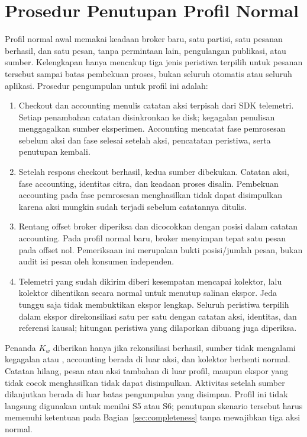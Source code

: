\section{Prosedur Penutupan Profil Normal}
Profil normal awal memakai keadaan broker baru, satu partisi, satu pesanan berhasil, dan satu pesan, tanpa permintaan lain, pengulangan publikasi, atau  sumber. Kelengkapan hanya mencakup tiga jenis peristiwa terpilih untuk pesanan tersebut sampai batas pembekuan proses, bukan seluruh  otomatis atau seluruh aplikasi. Prosedur pengumpulan untuk profil ini adalah:
\begin{enumerate}
  \item Checkout dan accounting menulis catatan aksi terpisah dari SDK telemetri. Setiap penambahan catatan disinkronkan ke disk; kegagalan penulisan menggagalkan sumber eksperimen. Accounting mencatat fase pemrosesan sebelum aksi dan fase selesai setelah aksi, pencatatan peristiwa, serta penutupan  kembali.
  \item Setelah respons checkout berhasil, kedua sumber dibekukan. Catatan aksi, fase accounting, identitas citra, dan keadaan proses disalin. Pembekuan accounting pada fase pemrosesan menghasilkan tidak dapat disimpulkan karena aksi mungkin sudah terjadi sebelum catatannya ditulis.
  \item Rentang offset broker diperiksa dan dicocokkan dengan posisi dalam catatan accounting. Pada profil normal baru, broker menyimpan tepat satu pesan pada offset nol. Pemeriksaan ini merupakan bukti posisi/jumlah pesan, bukan audit isi pesan oleh konsumen independen.
  \item Telemetri yang sudah dikirim diberi kesempatan mencapai kolektor, lalu kolektor dihentikan secara normal untuk menutup salinan ekspor. Jeda tunggu saja tidak membuktikan ekspor lengkap. Seluruh peristiwa terpilih dalam ekspor direkonsiliasi satu per satu dengan catatan aksi, identitas, dan referensi kausal; hitungan peristiwa yang dilaporkan dibuang juga diperiksa.
\end{enumerate}
Penanda $K_w$ diberikan hanya jika rekonsiliasi berhasil, sumber tidak mengalami kegagalan atau , accounting berada di luar aksi, dan kolektor berhenti normal. Catatan hilang, pesan atau aksi tambahan di luar profil, maupun ekspor yang tidak cocok menghasilkan tidak dapat disimpulkan. Aktivitas setelah sumber dilanjutkan berada di luar batas pengumpulan yang disimpan. Profil ini tidak langsung digunakan untuk menilai S5 atau S6; penutupan skenario tersebut harus memenuhi ketentuan pada Bagian~\ref{sec:completeness} tanpa mewajibkan tiga aksi normal.

